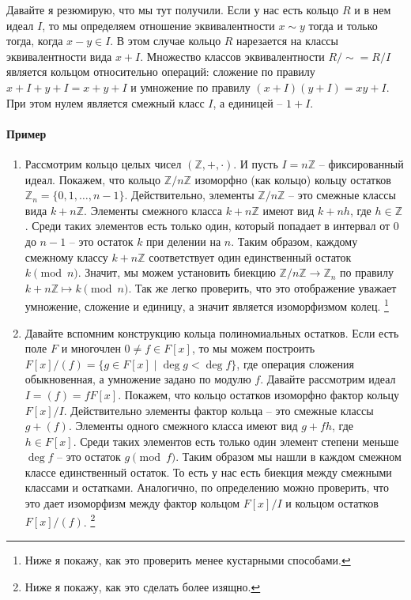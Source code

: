 Давайте я резюмирую, что мы тут получили.
Если у нас есть кольцо $R$ и в нем идеал $I$, то мы определяем отношение эквивалентности $x\sim y$ тогда и только тогда, когда $x - y \in I$.
В этом случае кольцо $R$ нарезается на классы эквивалентности вида $x + I$.
Множество классов эквивалентности $R/\sim = R/I$ является кольцом относительно операций: сложение по правилу $x + I + y + I = x + y + I$ и умножение по правилу $(x + I) (y + I) = xy + I$.
При этом нулем является смежный класс $I$, а единицей  -- $1 + I$.

\paragraph{Пример}

\begin{enumerate}
\item Рассмотрим кольцо целых чисел $(\mathbb Z, +, \cdot)$.
И пусть $I = n\mathbb Z$ -- фиксированный идеал.
Покажем, что кольцо $\mathbb Z/ n \mathbb Z$ изоморфно (как кольцо) кольцу остатков $\mathbb Z_n = \{0,1,\ldots,n-1\}$.
Действительно, элементы $\mathbb Z/n\mathbb Z$ -- это смежные классы вида $k + n\mathbb Z$.
Элементы смежного класса $k + n\mathbb Z$ имеют вид $k +nh$, где $h\in \mathbb Z$.
Среди таких элементов есть только один, который попадает в интервал от $0$ до $n-1$ -- это остаток $k$ при делении на $n$.
Таким образом, каждому смежному классу $k + n\mathbb Z$ соответствует один единственный остаток $k \pmod n$.
Значит, мы можем установить биекцию $\mathbb Z/n\mathbb Z \to \mathbb Z_n$ по правилу $k + n\mathbb Z \mapsto k \pmod n$.
Так же легко проверить, что это отображение уважает умножение, сложение и единицу, а значит является изоморфизмом колец.%
\footnote{Ниже я покажу, как это проверить менее кустарными способами.}

\item Давайте вспомним конструкцию кольца полиномиальных остатков.
Если есть поле $F$ и многочлен $0\neq f \in F[x]$, то мы можем построить $F[x] / (f) = \{g\in F[x] \mid \deg g < \deg f\}$, где операция сложения обыкновенная, а умножение задано по модулю $f$.
Давайте рассмотрим идеал $I = (f) = fF[x]$.
Покажем, что кольцо остатков изоморфно фактор кольцу $F[x]/I$.
Действительно элементы фактор кольца -- это смежные классы $g + (f)$.
Элементы одного смежного класса имеют вид $g + fh$, где $h\in F[x]$.
Среди таких элементов есть только один элемент степени меньше $\deg f$ -- это остаток $g \pmod f$.
Таким образом мы нашли в каждом смежном классе единственный остаток.
То есть у нас есть биекция между смежными классами и остатками.
Аналогично, по определению можно проверить, что это дает изоморфизм между фактор кольцом $F[x]/ I$ и кольцом остатков $F[x]/(f)$.%
\footnote{Ниже я покажу, как это сделать более изящно.}
\end{enumerate}

